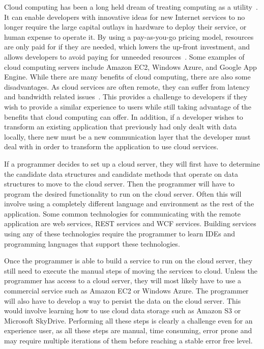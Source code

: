 \documentclass{sigplanconf}
\begin{document}

Cloud computing has been a long held dream of treating computing as a utility~\cite{Armbrust:2010:VCC:1721654.1721672}.  It can enable developers with innovative ideas for new Internet services to no longer require the large capital outlays in hardware to deploy their service, or human expense to operate it.  By using a pay-as-you-go pricing model, resources are only paid for if they are needed, which lowers the up-front investment, and allows developers to avoid paying for unneeded resources~\cite{zhang2010cloud}.  Some examples of cloud computing servers include Amazon EC2, Windows Azure, and Google App Engine.  While there are many benefits of cloud computing, there are also some disadvantages. As cloud services are often remote, they can suffer from latency and bandwidth related issues~\cite{4804045}.  This provides a challenge to developers if they wish to provide a similar experience to users while still taking advantage of the benefits that cloud computing can offer.  In addition, if a developer wishes to transform an existing application that previously had only dealt with data locally, there new must be a new communication layer that the developer must deal with 
in order to transform the application to use cloud services.  

If a programmer decides to set up a cloud server, they will first have to determine the candidate data structures and candidate methods that operate on data structures to move to the cloud server. Then the programmer will have to program the desired functionality to run on the cloud server.  Often this will involve using a completely different language and environment as the rest of the application.  Some common technologies for communicating with the remote application are web services, REST services and WCF services. Building services using any of these technologies require the programmer to learn IDEs and programming languages that support these technologies.

 Once the programmer is able to build a service to run on the cloud server, they still need to execute the manual steps of moving the services to cloud. Unless the programmer has access to a cloud server, they will most likely have to use a commercial service such as Amazon EC2 or Windows Azure. The programmer will also have to develop a way to persist the data on the cloud server.  This would involve learning how to use cloud data storage such as Amazon S3 or Microsoft SkyDrive.  Performing all these steps is clearly a challenge even for an experience user, as all these steps are manual, time consuming, error prone and may require multiple iterations of them before reaching a stable error free level.
  
\end{document}
